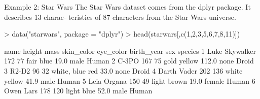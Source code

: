 \documentclass[11pt,handout,aspectratio=169]{beamer}
\begin{document}

\begin{frame}[fragile]{Example 2: Star Wars}
The Star Wars dataset comes from the dplyr package. It describes 13 charac-
teristics of 87 characters from the Star Wars universe.
\scriptsize
\begin{Schunk}
\begin{Sinput}
> data("starwars", package = "dplyr")
> head(starwars[,c(1,2,3,5,6,7,8,11)])
\end{Sinput}
\begin{Soutput}
            name height mass  skin_color eye_color birth_year    sex species
1 Luke Skywalker    172   77        fair      blue       19.0   male   Human
2          C-3PO    167   75        gold    yellow      112.0   none   Droid
3          R2-D2     96   32 white, blue       red       33.0   none   Droid
4    Darth Vader    202  136       white    yellow       41.9   male   Human
5    Leia Organa    150   49       light     brown       19.0 female   Human
6      Owen Lars    178  120       light      blue       52.0   male   Human
\end{Soutput}
\end{Schunk}
\end{frame}
\end{document}
